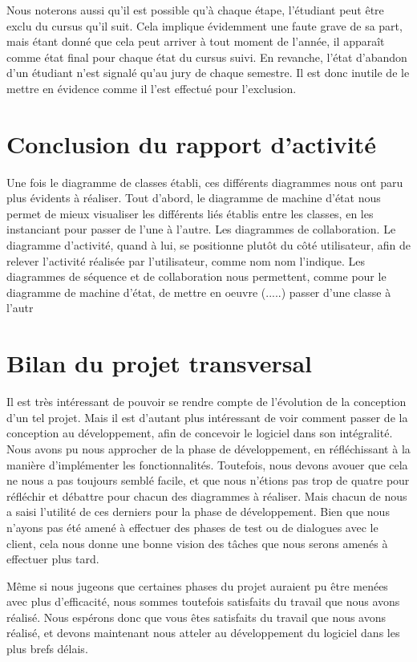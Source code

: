 \documentclass[letter, 11pt] {article}
\begin{document}
	Nous noterons aussi qu'il est possible qu'à chaque étape, l'étudiant peut être exclu du cursus qu'il suit. Cela implique évidemment une faute grave de sa part, mais étant donné que cela peut arriver à tout moment de l'année, il apparaît comme état final pour chaque état du cursus suivi.
	En revanche, l'état d'abandon d'un étudiant n'est signalé qu'au jury de chaque semestre. Il est donc inutile de le mettre en évidence comme il l'est effectué pour l'exclusion.
	
	\section{Conclusion du rapport d'activité}
	
	Une fois le diagramme de classes établi, ces différents diagrammes nous ont paru plus évidents à réaliser. Tout d'abord, le diagramme de machine d'état nous permet de mieux visualiser les différents liés établis entre les classes, en les instanciant pour passer de l'une à l'autre. Les diagrammes de collaboration. Le diagramme d'activité, quand à lui, se positionne plutôt du côté utilisateur, afin de relever l'activité réalisée par l'utilisateur, comme nom nom l'indique. Les diagrammes de séquence et de collaboration nous permettent, comme pour le diagramme de machine d'état, de mettre en oeuvre (.....) passer d'une classe à l'autr
	
	\section{Bilan du projet transversal}
	
	Il est très intéressant de pouvoir se rendre compte de l'évolution de la conception d'un tel projet. Mais il est d'autant plus intéressant de voir comment passer de la conception au développement, afin de concevoir le logiciel dans son intégralité. Nous avons pu nous approcher de la phase de développement, en réfléchissant à la manière d'implémenter les fonctionnalités. Toutefois, nous devons avouer que cela ne nous a pas toujours semblé facile, et que nous n'étions pas trop de quatre pour réfléchir et débattre pour chacun des diagrammes à réaliser. Mais chacun de nous a saisi l'utilité de ces derniers pour la phase de développement. Bien que nous n'ayons pas été amené à effectuer des phases de test ou de dialogues avec le client, cela nous donne une bonne vision des tâches que nous serons amenés à effectuer plus tard. 
	
	Même si nous jugeons que certaines phases du projet auraient pu être menées avec plus d'efficacité, nous sommes toutefois satisfaits du travail que nous avons réalisé. Nous espérons donc que vous êtes satisfaits du travail que nous avons réalisé, et devons maintenant nous atteler au développement du logiciel dans les plus brefs délais.
		
\end{document}
